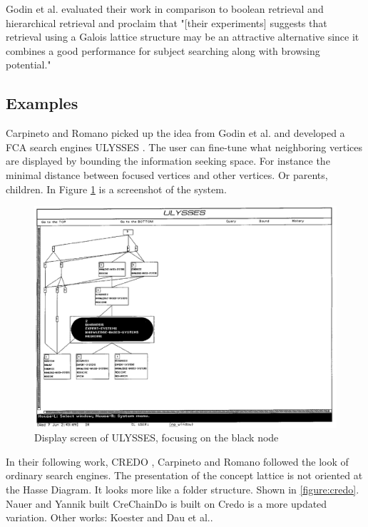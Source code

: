 \documentclass[11pt]{report}
\begin{document}
Godin et al. \cite{Godin1993} evaluated their work in comparison to boolean retrieval and hierarchical retrieval and proclaim that "[their experiments] suggests that retrieval using a Galois lattice structure may be an attractive alternative since it combines a good performance for subject searching along with browsing potential." \\

\subsection{Examples}

Carpineto and Romano picked up the idea from Godin et al. and developed a FCA search engines ULYSSES \cite{Carpineto1995,Carpineto1996}. The user can fine-tune what neighboring vertices are displayed by bounding the information seeking space. For instance the minimal distance between focused vertices and other vertices. Or parents, children. In Figure \ref{figure:ulysses} is a screenshot of the system. \\

\begin{figure}[h]
	\centering
	\includegraphics[width=\linewidth]{images/ulysses}
\caption{Display screen of ULYSSES, focusing on the black node \cite{Carpineto1996} }
\label{figure:ulysses}
\end{figure}

In their following work, CREDO \cite{Carpineto2004}, Carpineto and Romano followed the look of ordinary search engines. The presentation of the concept lattice is not oriented at the Hasse Diagram. It looks more like a folder structure. Shown in \ref{figure:credo}. Nauer and Yannik built CreChainDo \cite{Nauer2009} is built on Credo is a more updated variation. Other works: Koester \cite{Koester2006} and Dau et al.\cite{Dau2008}.\\
\end{document}
